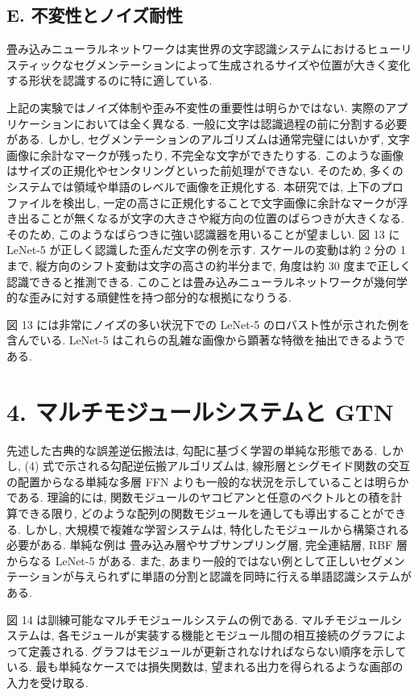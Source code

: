 \documentclass[twocolumn]{jarticle}     %
\begin{document}
\subsection{E. 不変性とノイズ耐性}
畳み込みニューラルネットワークは実世界の文字認識システムにおけるヒューリスティックなセグメンテーションによって生成されるサイズや位置が大きく変化する形状を認識するのに特に適している.
\par
上記の実験ではノイズ体制や歪み不変性の重要性は明らかではない. 実際のアプリケーションにおいては全く異なる.
一般に文字は認識過程の前に分割する必要がある. しかし, セグメンテーションのアルゴリズムは通常完璧にはいかず, 文字画像に余計なマークが残ったり, 不完全な文字ができたりする. このような画像はサイズの正規化やセンタリングといった前処理ができない.
そのため, 多くのシステムでは領域や単語のレベルで画像を正規化する. 本研究では, 上下のプロファイルを検出し, 一定の高さに正規化することで文字画像に余計なマークが浮き出ることが無くなるが文字の大きさや縦方向の位置のばらつきが大きくなる. そのため, このようなばらつきに強い認識器を用いることが望ましい. 図 13 に LeNet-5 が正しく認識した歪んだ文字の例を示す. スケールの変動は約 2 分の 1 まで, 縦方向のシフト変動は文字の高さの約半分まで, 角度は約 30 度まで正しく認識できると推測できる. このことは畳み込みニューラルネットワークが幾何学的な歪みに対する頑健性を持つ部分的な根拠になりうる.
\par
図 13 には非常にノイズの多い状況下での LeNet-5 のロバスト性が示された例を含んでいる. LeNet-5 はこれらの乱雑な画像から顕著な特徴を抽出できるようである.

\section*{4. マルチモジュールシステムと GTN}
先述した古典的な誤差逆伝搬法は, 勾配に基づく学習の単純な形態である.
しかし, (4) 式で示される勾配逆伝搬アルゴリズムは, 
線形層とシグモイド関数の交互の配置からなる単純な多層 FFN よりも一般的な状況を示していることは明らかである.
理論的には, 関数モジュールのヤコビアンと任意のベクトルとの積を計算できる限り, どのような配列の関数モジュールを通しても導出することができる.
しかし, 大規模で複雑な学習システムは, 特化したモジュールから構築される必要がある. 
単純な例は 畳み込み層やサブサンプリング層, 完全連結層, RBF 層からなる LeNet-5 がある. また, あまり一般的ではない例として正しいセグメンテーションが与えられずに単語の分割と認識を同時に行える単語認識システムがある.
\par
図 14 は訓練可能なマルチモジュールシステムの例である.
マルチモジュールシステムは, 各モジュールが実装する機能とモジュール間の相互接続のグラフによって定義される. グラフはモジュールが更新されなければならない順序を示している.
最も単純なケースでは損失関数は, 望まれる出力を得られるような画部の入力を受け取る.
\end{document}
